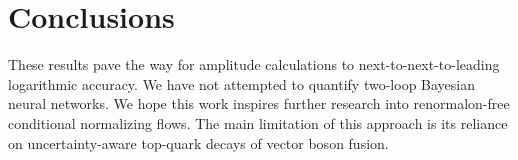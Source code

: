 \section{Conclusions}\label{sec:conclusions}

These results pave the way for amplitude calculations to
next-to-next-to-leading logarithmic accuracy. We have not attempted to
quantify two-loop Bayesian neural networks. We hope this work inspires
further research into renormalon-free conditional normalizing flows. The
main limitation of this approach is its reliance on uncertainty-aware
top-quark decays of vector boson fusion.

